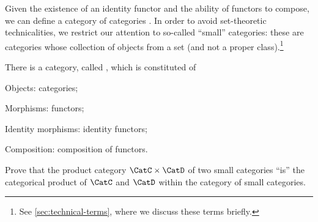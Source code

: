 Given the existence of an identity functor and the ability of functors to compose, we can define a category of categories \Category. In order to avoid set-theoretic technicalities, we restrict our attention to so-called ``small'' categories: these are categories whose collection of objects from a set (and not a proper class).\footnote{See \cref{sec:technical-terms}, where we discuss these terms briefly.}

\begin{ctdefinition}
  \label{def:Category}
  There is a category, called \Category, which is constituted of
  \begin{compactitem}
    \item Objects: categories;
    \item Morphisms: functors;
    \item Identity morphisms: identity functors;
    \item Composition: composition of functors.
  \end{compactitem}
\end{ctdefinition}

   \begin{gradedexercise}
 Prove that the product category $\CatC \times \CatD$ of two small categories ``is'' the categorical product of $\CatC$ and $\CatD$ within the category of small categories.
  \end{gradedexercise}


